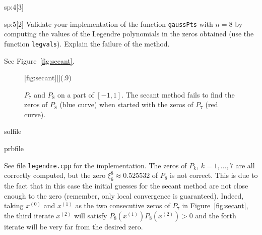 \begin{samproblem}
\begin{subproblem}{sp:4}[3]
\end{subproblem}

\begin{subproblem}{sp:5}[2]
  Validate your implementation of the function \texttt{gaussPts} with $n=8$ by computing the values of the Legendre polynomials 
  in the zeros obtained (use the function \texttt{legvals}). Explain the failure of the method.
  \begin{samhint}
    See Figure~\ref{fig:secant}.
  \end{samhint}

  \begin{center} %
    \begin{figure}[ht]
      [fig:secant][](.9\textwidth)
      \caption{$P_7$ and $P_8$ on a part of $[-1,1]$. The secant method fails to find the zeros of $P_8$ (blue curve) when 
               started with the zeros of $P_7$ (red curve).}
    \end{figure}
  \end{center}

  \begin{samwriteprbpart}{solfile}
    \begin{writeverbatim}{prbfile}
      \begin{samsolution}
        See file \texttt{legendre.cpp} for the implementation. The zeros of $P_k$, $k=1,\dots,7$ are all correctly computed,
        but the zero $\xi^8_6\approx 0.525532$ of $P_8$ is not correct. This is due to the fact that in this case the initial guesses 
        for the secant method are not close enough to the zero (remember, only local convergence is guaranteed). 
        Indeed, taking $x^{(0)}$ and $x^{(1)}$ as the two consecutive zeros of $P_7$ in Figure~\ref{fig:secant}, the third iterate $x^{(2)}$ 
        will satisfy $P_8(x^{(1)})P_8(x^{(2)})>0$ and the forth iterate will be very far from the desired zero.
      \end{samsolution}
    \end{writeverbatim}
  \end{samwriteprbpart}

\end{subproblem}


\end{samproblem}
